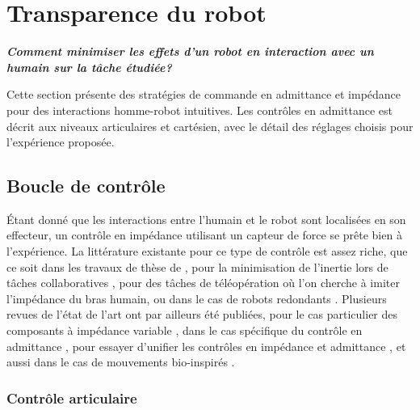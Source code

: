 \documentclass[12pt, a4paper]{article} %
\numberwithin{equation}{section}
\begin{document}
\section{Transparence du robot} \label{sec_robot}

\begin{flushright}
	{\color{DarkGoldenrod} \textit{\textbf{Comment minimiser les effets d'un robot en interaction avec un humain sur la tâche étudiée?}}}
\end{flushright}

Cette section présente des stratégies de commande en admittance et impédance pour des interactions homme-robot intuitives. Les contrôles en admittance est décrit aux niveaux articulaires et cartésien, avec le détail des réglages choisis pour l'expérience proposée.


\subsection{Boucle de contrôle} \label{sec_robot_sub_ctrl_loop}

Étant donné que les interactions entre l'humain et le robot sont localisées en son effecteur, un contrôle en impédance utilisant un capteur de force se prête bien à l'expérience. La littérature existante pour ce type de contrôle est assez riche, que ce soit dans les travaux de thèse de \cite{lamy_conception_2011}, pour la minimisation de l'inertie lors de tâches collaboratives \citep{Lamy_achieving_2009}, pour des tâches de téléopération \citep{ajoudani_tele-impedance_2012} où l'on cherche à imiter l'impédance du bras humain, ou dans le cas de robots redondants \citep{ficuciello_cartesian_2014}. Plusieurs revues de l'état de l'art ont par ailleurs été publiées, pour le cas particulier des composants à impédance variable \citep{vanderborght_variable_2013}, dans le cas spécifique du contrôle en admittance \citep{keemink_admittance_2018}, pour essayer d'unifier les contrôles en impédance et admittance \citep{ott_unified_2010}, et aussi dans le cas de mouvements bio-inspirés \citep{al-shuka_active_2018}.

\subsubsection{Contrôle articulaire} \label{sec_robot_sub_ctrl_loop_sub_joint}
\end{document}
